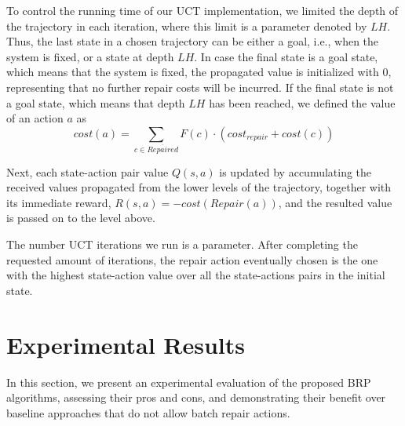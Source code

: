 \documentclass[review]{elsarticle}
\newcommand\meir[1]{\textcolor{red}{meir: #1}}
\newcommand{\notrepaired}{{\overline{\textit{Repaired}}}}
\begin{document}
To control the running time of our UCT implementation, we limited the depth of the trajectory in each iteration, where this limit is a parameter denoted by $LH$. 
Thus, the last state in a chosen trajectory can be either a goal, i.e., when the system is fixed, or a state at depth $LH$. In case the final state is a goal state, which means that the system is fixed, the propagated value is initialized with 0, representing that no further repair costs will be incurred. If the final state is not a goal state, which means that  depth $LH$ has been reached, we defined the value of an action $a$ as 
\begin{equation}
    cost(a)=\sum_{c\in \notrepaired{}} F(c)\cdot(cost_{repair}+cost(c))
\end{equation}

Next, each state-action pair value $Q(s,a)$ is updated by accumulating the received values propagated from the lower levels of the trajectory, together with its immediate reward, $R(s,a) = -cost(Repair(a))$, and the resulted value is passed on to the level above. 

The number UCT iterations we run is a parameter. After completing the requested amount of iterations, the repair action eventually chosen is the one with the highest state-action value over all the state-actions pairs in the initial state.

\section{Experimental Results}
\label{sec:experimental-results}
In this section, we present an experimental evaluation of the proposed BRP algorithms, assessing their pros and cons, and demonstrating their benefit over baseline  approaches that do not allow batch repair actions. 

\end{document}
